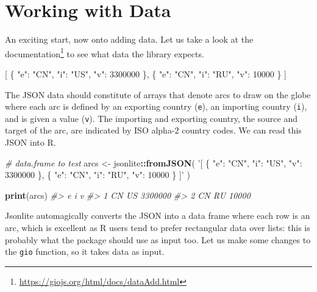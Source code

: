 \documentclass[10pt,]{krantz}
\makeatletter
\newenvironment{Shaded}{\begin{snugshade}}{\end{snugshade}}
\newcommand{\CommentTok}[1]{\textcolor[rgb]{0.37,0.37,0.37}{\textit{#1}}}
\newcommand{\DataTypeTok}[1]{\textcolor[rgb]{0.27,0.27,0.27}{#1}}
\newcommand{\DecValTok}[1]{\textcolor[rgb]{0.06,0.06,0.06}{#1}}
\newcommand{\FunctionTok}[1]{\textcolor[rgb]{0,0,0}{#1}}
\newcommand{\KeywordTok}[1]{\textcolor[rgb]{0.27,0.27,0.27}{\textbf{#1}}}
\newcommand{\NormalTok}[1]{#1}
\newcommand{\OperatorTok}[1]{\textcolor[rgb]{0.43,0.43,0.43}{\textbf{#1}}}
\newcommand{\OtherTok}[1]{\textcolor[rgb]{0.37,0.37,0.37}{#1}}
\newcommand{\StringTok}[1]{\textcolor[rgb]{0.5,0.5,0.5}{#1}}
\renewcommand{\href}[2]{#2\footnote{\url{#1}}}
\newenvironment{kframe}{%
\medskip{}
\setlength{\fboxsep}{.8em}
 \def\at@end@of@kframe{}%
 \ifinner\ifhmode%
  \def\at@end@of@kframe{\end{minipage}}%
  \begin{minipage}{\columnwidth}%
 \fi\fi%
 \def\FrameCommand##1{\hskip\@totalleftmargin \hskip-\fboxsep
 \colorbox{shadecolor}{##1}\hskip-\fboxsep
     \hskip-\linewidth \hskip-\@totalleftmargin \hskip\columnwidth}%
 \MakeFramed {\advance\hsize-\width
   \@totalleftmargin\z@ \linewidth\hsize
   \@setminipage}}%
 {\par\unskip\endMakeFramed%
 \at@end@of@kframe}
\renewenvironment{Shaded}{\begin{kframe}}{\end{kframe}}
\makeatother
\begin{document}
\hypertarget{widgets-full-data}{%
\section{Working with Data}\label{widgets-full-data}}

An exciting start, now onto adding data. Let us take a look at the \href{https://giojs.org/html/docs/dataAdd.html}{documentation} to see what data the library expects.

\begin{Shaded}
\begin{Highlighting}[]
\OtherTok{[}
  \FunctionTok{\{}
    \DataTypeTok{"e"}\FunctionTok{:} \StringTok{"CN"}\FunctionTok{,}
    \DataTypeTok{"i"}\FunctionTok{:} \StringTok{"US"}\FunctionTok{,}
    \DataTypeTok{"v"}\FunctionTok{:} \DecValTok{3300000}
  \FunctionTok{\}}\OtherTok{,}
  \FunctionTok{\{}
    \DataTypeTok{"e"}\FunctionTok{:} \StringTok{"CN"}\FunctionTok{,}
    \DataTypeTok{"i"}\FunctionTok{:} \StringTok{"RU"}\FunctionTok{,}
    \DataTypeTok{"v"}\FunctionTok{:} \DecValTok{10000}
  \FunctionTok{\}}
\OtherTok{]}
\end{Highlighting}
\end{Shaded}

The JSON data should constitute of arrays that denote arcs to draw on the globe where each arc is defined by an exporting country (\texttt{e}), an importing country (\texttt{i}), and is given a value (\texttt{v}). The importing and exporting country, the source and target of the arc, are indicated by ISO alpha-2 country codes. We can read this JSON into R.

\begin{Shaded}
\begin{Highlighting}[]
\CommentTok{# data.frame to test}
\NormalTok{arcs <-}\StringTok{ }\NormalTok{jsonlite}\OperatorTok{::}\KeywordTok{fromJSON}\NormalTok{(}
  \StringTok{'[}
\StringTok{    \{}
\StringTok{      "e": "CN",}
\StringTok{      "i": "US",}
\StringTok{      "v": 3300000}
\StringTok{    \},}
\StringTok{    \{}
\StringTok{      "e": "CN",}
\StringTok{      "i": "RU",}
\StringTok{      "v": 10000}
\StringTok{    \}}
\StringTok{  ]'}
\NormalTok{)}

\KeywordTok{print}\NormalTok{(arcs)}
\CommentTok{#>    e  i       v}
\CommentTok{#> 1 CN US 3300000}
\CommentTok{#> 2 CN RU   10000}
\end{Highlighting}
\end{Shaded}

Jsonlite automagically converts the JSON into a data frame where each row is an arc, which is excellent as R users tend to prefer rectangular data over lists: this is probably what the package should use as input too. Let us make some changes to the \texttt{gio} function, so it takes data as input.
\end{document}
